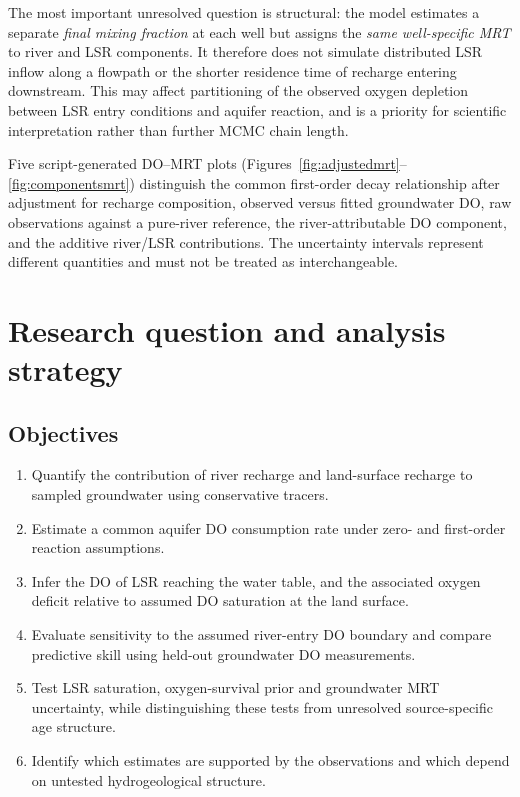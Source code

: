 \documentclass[11pt,a4paper]{article}
\begin{document}
The most important unresolved question is structural: the model estimates a separate \emph{final mixing fraction} at each well but assigns the \emph{same well-specific MRT} to river and LSR components. It therefore does not simulate distributed LSR inflow along a flowpath or the shorter residence time of recharge entering downstream. This may affect partitioning of the observed oxygen depletion between LSR entry conditions and aquifer reaction, and is a priority for scientific interpretation rather than further MCMC chain length.

Five script-generated DO--MRT plots (Figures~\ref{fig:adjustedmrt}--\ref{fig:componentsmrt}) distinguish the common first-order decay relationship after adjustment for recharge composition, observed versus fitted groundwater DO, raw observations against a pure-river reference, the river-attributable DO component, and the additive river/LSR contributions. The uncertainty intervals represent different quantities and must not be treated as interchangeable.

\section{Research question and analysis strategy}
\subsection{Objectives}
\begin{enumerate}
\item Quantify the contribution of river recharge and land-surface recharge to sampled groundwater using conservative tracers.
\item Estimate a common aquifer DO consumption rate under zero- and first-order reaction assumptions.
\item Infer the DO of LSR reaching the water table, and the associated oxygen deficit relative to assumed DO saturation at the land surface.
\item Evaluate sensitivity to the assumed river-entry DO boundary and compare predictive skill using held-out groundwater DO measurements.
\item Test LSR saturation, oxygen-survival prior and groundwater MRT uncertainty, while distinguishing these tests from unresolved source-specific age structure.
\item Identify which estimates are supported by the observations and which depend on untested hydrogeological structure.
\end{enumerate}
\end{document}
